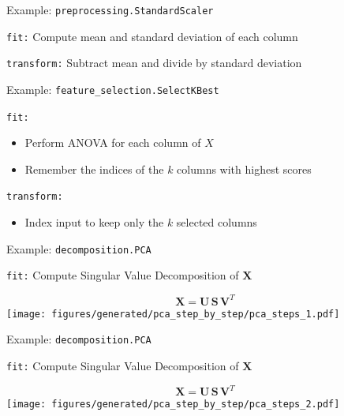 \documentclass[presentation,mathserif,table]{beamer}
\newcommand{\X}{{\mathbold X}}
\newcommand{\bS}{{\mathbold S}}
\newcommand{\U}{{\mathbold U}}
\newcommand{\V}{{\mathbold V}}
\begin{document}
\begin{frame}[label={sec:orge69a336},fragile]{Example: \texttt{preprocessing.StandardScaler}}
 \begin{block}{\texttt{fit:}}
Compute mean and standard deviation of each column
\end{block}
\begin{block}{\texttt{transform:}}
Subtract mean and divide by standard deviation
\end{block}
\end{frame}
\begin{frame}[label={sec:org32dc6a3},fragile]{Example: \texttt{feature\_selection.SelectKBest}}
 \begin{block}{\texttt{fit:}}
\begin{itemize}
\item Perform ANOVA for each column of \(X\)
\item Remember the indices of the \(k\) columns with highest scores
\end{itemize}
\end{block}
\begin{block}{\texttt{transform:}}
\begin{itemize}
\item Index input to keep only the \(k\) selected columns
\end{itemize}
\end{block}
\end{frame}

\begin{frame}[label={sec:org480d059},fragile]{Example: \texttt{decomposition.PCA}}
 \begin{block}{\texttt{fit:}}
Compute Singular Value Decomposition of \(\X\)
\begin{structureenv} %
\begin{equation}
\X = \U \, \bS \, \V^T
\end{equation}
\texttt{[image: figures/generated/pca\_step\_by\_step/pca\_steps\_1.pdf]}
\end{structureenv}
\end{block}
\end{frame}

\begin{frame}[label={sec:org99d1fd6},fragile]{Example: \texttt{decomposition.PCA}}
 \begin{block}{\texttt{fit:}}
Compute Singular Value Decomposition of \(\X\)
\begin{structureenv} %
\begin{equation}
\X = \U \, \bS \, \V^T
\end{equation}
\texttt{[image: figures/generated/pca\_step\_by\_step/pca\_steps\_2.pdf]}
\end{structureenv}
\end{block}
\end{frame}
\end{document}
